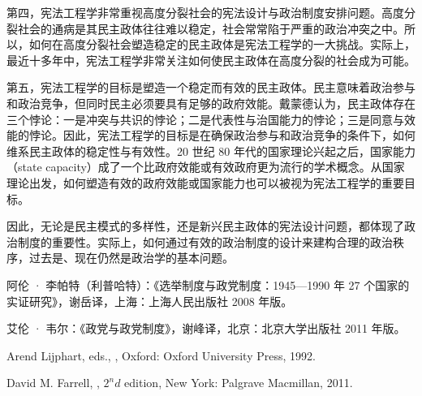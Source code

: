 第四，宪法工程学非常重视高度分裂社会的宪法设计与政治制度安排问题。高度分裂社会的通病是其民主政体往往难以稳定，社会常常陷于严重的政治冲突之中。所以，如何在高度分裂社会塑造稳定的民主政体是宪法工程学的一大挑战。实际上，最近十多年中，宪法工程学非常关注如何使民主政体在高度分裂的社会成为可能。

第五，宪法工程学的目标是塑造一个稳定而有效的民主政体。民主意味着政治参与和政治竞争，但同时民主必须要具有足够的政府效能。戴蒙德认为，民主政体存在三个悖论：一是冲突与共识的悖论；二是代表性与治国能力的悖论；三是同意与效能的悖论。因此，宪法工程学的目标是在确保政治参与和政治竞争的条件下，如何维系民主政体的稳定性与有效性。20 世纪 80 年代的国家理论兴起之后，国家能力（state capacity）成了一个比政府效能或有效政府更为流行的学术概念。从国家理论出发，如何塑造有效的政府效能或国家能力也可以被视为宪法工程学的重要目标。

因此，无论是民主模式的多样性，还是新兴民主政体的宪法设计问题，都体现了政治制度的重要性。实际上，如何通过有效的政治制度的设计来建构合理的政治秩序，过去是、现在仍然是政治学的基本问题。


阿伦 · 李帕特（利普哈特）：《选举制度与政党制度：1945—1990 年 27 个国家的实证研究》，谢岳译，上海：上海人民出版社 2008 年版。

艾伦 · 韦尔：《政党与政党制度》，谢峰译，北京：北京大学出版社 2011 年版。

Arend Lijphart, eds., , Oxford: Oxford University Press, 1992.

David M. Farrell, , $2^nd$ edition, New York: Palgrave Macmillan, 2011.
